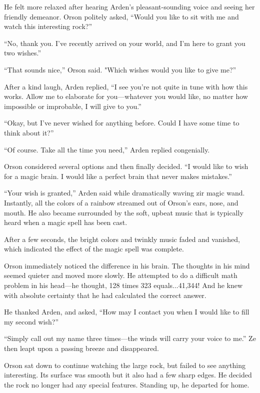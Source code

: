 He felt more relaxed after hearing Arden's pleasant-sounding voice and seeing her friendly demeanor. Orson politely asked, “Would you like to sit with me and watch this interesting rock?”

“No, thank you. I've recently arrived on your world, and I'm here to grant you two wishes.”

“That sounds nice,” Orson said. "Which wishes would you like to give me?”

After a kind laugh, Arden replied, “I see you're not quite in tune with how this works. Allow me to elaborate for you—whatever you would like, no matter how impossible or improbable, I will give to you.”

“Okay, but I've never wished for anything before. Could I have some time to think about it?”

“Of course. Take all the time you need,” Arden replied congenially.

Orson considered several options and then finally decided. “I would like to wish for a magic brain. I would like a perfect brain that never makes mistakes.”

“Your wish is granted,” Arden said while dramatically waving zir magic wand. Instantly, all the colors of a rainbow streamed out of Orson's ears, nose, and mouth. He also became surrounded by the soft, upbeat music that is typically heard when a magic spell has been cast.

After a few seconds, the bright colors and twinkly music faded and vanished, which indicated the effect of the magic spell was complete.

Orson immediately noticed the difference in his brain. The thoughts in his mind seemed quieter and moved more slowly. He attempted to do a difficult math problem in his head—he thought, 128 times 323 equals...41,344! And he knew with absolute certainty that he had calculated the correct answer.

He thanked Arden, and asked, “How may I contact you when I would like to fill my second wish?”

“Simply call out my name three times—the winds will carry your voice to me.” Ze then leapt upon a passing breeze and disappeared.

Orson sat down to continue watching the large rock, but failed to see anything interesting. Its surface was smooth but it also had a few sharp edges. He decided the rock no longer had any special features. Standing up, he departed for home.

\timesep

